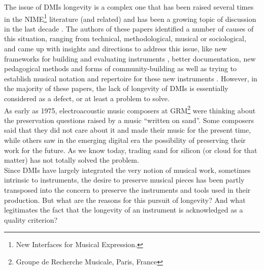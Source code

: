The issue of DMIs longevity is a complex one that has been raised several times in the NIME\footnote{New Interfaces for Musical Expression.} literature (and related) and has been a growing topic of discussion in the last decade \cite{3}\cite{morreale_design_2017}. The authors of these papers identified a number of causes of this situation, ranging from technical, methodological, musical or sociological, and came up with insights and directions to address this issue, like new frameworks for building and evaluating instruments  \cite{Jorda:2004} \cite{morreale_design_2017}, better documentation, new pedagogical methods and forms of community-building as well as trying to establish musical notation and repertoire for these new instruments \cite{mamedes_composing_2014}\cite{mays_notation_2014}. However, in the majority of these papers, the lack of longevity of DMIs is essentially considered as a defect, or at least a problem to solve.\\
\indent As early as 1975, electroacoustic music composers at GRM\footnote{Groupe de Recherche Musicale, Paris, France} were thinking about the preservation questions raised by a music “written on sand”. Some composers said that they did not care about it and made their music for the present time, while others saw in the emerging digital era the possibility of preserving their work for the future. As we know today, trading sand for silicon (or cloud for that matter) has not totally solved the problem.\\
\indent Since DMIs have largely integrated the very notion of musical work, sometimes intrinsic to instruments, the desire to preserve musical pieces has been partly transposed into the concern to preserve the instruments and tools used in their production. But what are the reasons for this pursuit of longevity? And what legitimates the fact that the longevity of an instrument is acknowledged as a quality criterion? 

